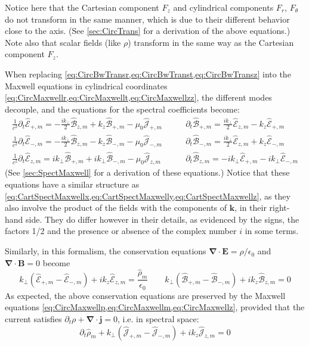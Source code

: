 \documentclass[1p,times,authoryear]{elsarticle}
\renewcommand{\vec}[1]{\boldsymbol{#1}}
\newcommand{\spectral}[1]{\hat{\mathcal{#1}}}
\begin{document}
\noindent Notice here that the Cartesian
component $F_z$ and cylindrical components
$F_r$, $F_\theta$ do not transform in the same manner, which is due
to their different behavior close to the axis. (See
\ref{sec:CircTrans} for a derivation of the above equations.) 
Note also that scalar fields (like $\rho$) transform in the
same way as the Cartesian component $F_z$. 

When replacing \cref{eq:CircBwTransr,eq:CircBwTranst,eq:CircBwTransz} into the Maxwell equations in cylindrical
coordinates \cref{eq:CircMaxwellr,eq:CircMaxwellt,eq:CircMaxwellzz},
the different modes decouple, and the equations for the spectral
coefficients become:
\begin{align}
\frac{1}{c^2}\partial_t \spectral{E}_{+,m} = - \frac{ik_\perp }{2}\spectral{B}_{z,m} + k_z\spectral{B}_{+,m} - \mu_0\spectral{J}_{+,m} \qquad &   
\partial_t \spectral{B}_{+,m} = \frac{ik_\perp }{2} \spectral{E}_{z,m} - k_z
\spectral{E}_{+,m} 
\label{eq:CircMaxwellp} \\
\frac{1}{c^2}\partial_t \spectral{E}_{-,m} = -\frac{ik_\perp }{2} \spectral{B}_{z,m} - k_z \spectral{B}_{-,m} - \mu_0  \spectral{J}_{-,m} \qquad &   
\partial_t \spectral{B}_{-,m} = \frac{ik_\perp }{2} \spectral{E}_{z,m} + k_z
\spectral{E}_{-,m} \label{eq:CircMaxwellm} \\
\frac{1}{c^2}\partial_t \spectral{E}_{z,m} = ik_\perp  \spectral{B}_{+,m} + ik_\perp \spectral{B}_{-,m}  - \mu_0 \spectral{J}_{z,m}  \qquad & 
\partial_t \spectral{B}_{z,m} = -ik_\perp  \spectral{E}_{+,m} - ik_\perp \spectral{E}_{-,m}  \label{eq:CircMaxwellz} 
\end{align}
(See \ref{sec:SpectMaxwell} for a derivation of these equations.)
Notice that these equations have a similar structure as 
\cref{eq:CartSpectMaxwellx,eq:CartSpectMaxwelly,eq:CartSpectMaxwellz}, as 
they also involve the product of the fields with the components of
$\vec{k}$, in their right-hand side. They do differ however in their
details, as evidenced by the signs, the factors 1/2 and the
presence or absence of the complex number $i$ in some terms.

Similarly, in this formalism, the conservation equations
$\vec{\nabla}\cdot\vec{E}=\rho/\epsilon_0$ and
$\vec{\nabla}\cdot\vec{B} = 0$
become
\begin{equation}
\label{eq:SpectCons}
k_\perp (\spectral{E}_{+,m} -\spectral{E}_{-,m}) + ik_z \spectral{E}_{z,m} =
\frac{\spectral{\rho}_m}{\epsilon_0} \qquad
 k_\perp (\spectral{B}_{+,m} -\spectral{B}_{-,m}) + ik_z \spectral{B}_{z,m} =
0 \end{equation}
As expected, the above conservation equations are
preserved by the Maxwell equations
\cref{eq:CircMaxwellp,eq:CircMaxwellm,eq:CircMaxwellz}, provided
that the current satisfies $\partial_t
\rho + \vec{\nabla} \cdot \vec{j} = 0$, i.e. in spectral space:
\begin{equation}
\label{eq:SpectCharge}
\partial_t \spectral{\rho}_m + k_\perp (\spectral{J}_{+,m} -\spectral{J}_{-,m}) + ik_z
\spectral{J}_{z,m} = 0
\end{equation}  
\end{document}

